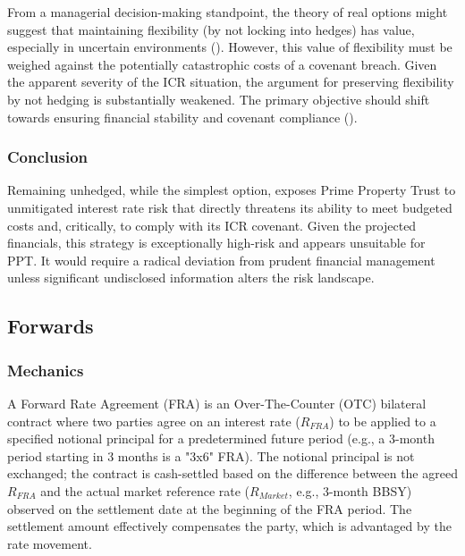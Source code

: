 \documentclass[11pt, a4paper, british]{article}
\begin{document}
From a managerial decision-making standpoint, the theory of real options might suggest that maintaining flexibility (by not locking into hedges) has value, especially in uncertain environments (\cite{d}). However, this value of flexibility must be weighed against the potentially catastrophic costs of a covenant breach. Given the apparent severity of the ICR situation, the argument for preserving flexibility by not hedging is substantially weakened. The primary objective should shift towards ensuring financial stability and covenant compliance (\cite{t}).

\subsubsection{Conclusion}
Remaining unhedged, while the simplest option, exposes Prime Property Trust to unmitigated interest rate risk that directly threatens its ability to meet budgeted costs and, critically, to comply with its ICR covenant. Given the projected financials, this strategy is exceptionally high-risk and appears unsuitable for PPT. It would require a radical deviation from prudent financial management unless significant undisclosed information alters the risk landscape.

\newpage

\subsection{Forwards}

\subsubsection{Mechanics}
A Forward Rate Agreement (FRA) is an Over-The-Counter (OTC) bilateral contract where two parties agree on an interest rate ($R_{FRA}$) to be applied to a specified notional principal for a predetermined future period (e.g., a 3-month period starting in 3 months is a "3x6" FRA). The notional principal is not exchanged; the contract is cash-settled based on the difference between the agreed $R_{FRA}$ and the actual market reference rate ($R_{Market}$, e.g., 3-month BBSY) observed on the settlement date at the beginning of the FRA period. The settlement amount effectively compensates the party, which is advantaged by the rate movement.
\end{document}
